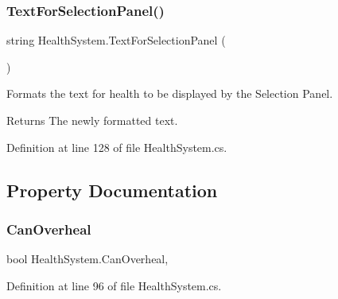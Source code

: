 \mbox{\label{class_health_system_ab25c1f3f05672c28f452afa2d0125e97}} 
\subsubsection{\texorpdfstring{Text\+For\+Selection\+Panel()}{TextForSelectionPanel()}}
{\footnotesize\ttfamily string Health\+System.\+Text\+For\+Selection\+Panel (\begin{DoxyParamCaption}{ }\end{DoxyParamCaption})}



Formats the text for health to be displayed by the Selection Panel. 

\begin{DoxyReturn}{Returns}
The newly formatted text.
\end{DoxyReturn}


Definition at line 128 of file Health\+System.\+cs.



\subsection{Property Documentation}
\mbox{\label{class_health_system_af7bb446d9ab48284d61dbf387aa8bcfb}} 
\subsubsection{\texorpdfstring{Can\+Overheal}{CanOverheal}}
{\footnotesize\ttfamily bool Health\+System.\+Can\+Overheal\hspace{0.3cm}{\ttfamily [get]}, {\ttfamily [set]}}



Definition at line 96 of file Health\+System.\+cs.

\mbox{\label{class_health_system_ac252024753768287f4e6c07657f03a95}} 
